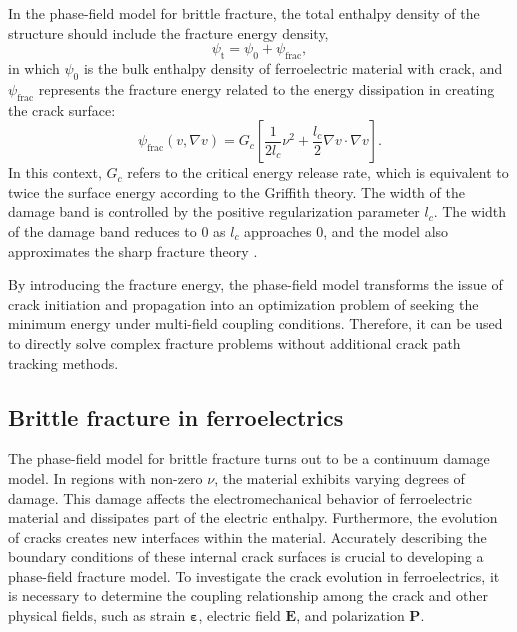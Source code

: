 In the phase-field model for brittle fracture, the total enthalpy density of the structure should include the fracture energy density,
\begin{equation}
    \psi_{\mathrm{t}}=\psi_0+\psi_{\mathrm{frac}},
\end{equation}
in which $\psi_0$ is the bulk enthalpy density of ferroelectric material with crack, and $\psi_\mathrm{frac}$ represents the fracture energy related to the energy dissipation in creating the crack surface:
\begin{equation}\label{eq9}
    \psi_{\mathrm{frac}}(v,\nabla v)=G_c\left[\frac{1}{2l_c}\nu^2+\frac{l_c}{2}\nabla v\cdot \nabla v\right].
\end{equation}
In this context,  $G_c$ refers to the critical energy release rate, which is equivalent to twice the surface energy according to the Griffith theory. The width of the damage band is controlled by the positive regularization parameter $l_c$. The width of the damage band reduces to 0 as $l_c$ approaches 0, and the model also approximates the sharp fracture theory \cite{miehe_thermodynamically_2010}.

By introducing the fracture energy, the phase-field model transforms the issue of crack initiation and propagation  into an optimization problem of seeking the minimum energy under multi-field coupling conditions. Therefore, it can be used to directly solve complex fracture problems without additional crack path tracking methods.

\subsection{Brittle fracture in ferroelectrics}
The phase-field model for brittle fracture turns out to be a continuum damage model. In regions with non-zero $\nu$, the material exhibits varying degrees of damage. This damage affects the electromechanical behavior of ferroelectric material and dissipates part of the electric enthalpy. Furthermore, the evolution of cracks creates new interfaces within the material. Accurately describing the boundary conditions of these internal crack surfaces is crucial to developing a phase-field fracture model. To investigate the crack evolution in ferroelectrics, it is necessary to determine the coupling relationship among the crack and other physical fields, such as strain $\mathbf{\varepsilon}$, electric field $\mathbf{E}$, and polarization $\mathbf{P}$. 

